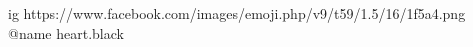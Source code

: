  
 
 
 
 

\ifcmt
  ig https://www.facebook.com/images/emoji.php/v9/t59/1.5/16/1f5a4.png
  @name heart.black

\fi
